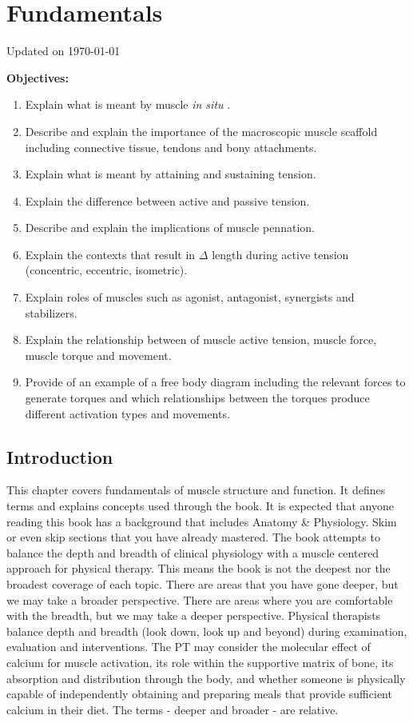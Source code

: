 \chapter{Fundamentals}\label{chp:fundamentals}
Updated on \today

\minitoc

\begin{svgraybox}
   \textbf{Objectives:}
\begin{enumerate}
   \item Explain what is meant by muscle \textit{in situ} .
    \item Describe and explain the importance of the macroscopic muscle scaffold including connective tissue, tendons and bony attachments.
    \item Explain what is meant by attaining and sustaining tension.
    \item Explain the difference between active and passive tension.
    \item Describe and explain the implications of muscle pennation.
    \item Explain the contexts that result in $\Delta$ length during active tension (concentric, eccentric, isometric).
    \item Explain roles of muscles such as agonist, antagonist, synergists and stabilizers.
    \item Explain the relationship between of muscle active tension, muscle force, muscle torque and movement.
    \item Provide of an example of a free body diagram including the relevant forces to generate torques and which relationships between the torques produce different activation types and movements.
\end{enumerate}
\end{svgraybox}

\section*{Introduction}
This chapter covers fundamentals of muscle structure and function. It defines terms and explains concepts used through the book. It is expected that anyone reading this book has a background that includes Anatomy \& Physiology. Skim or even skip sections that you have already mastered. The book attempts to balance the depth and breadth of clinical physiology with a muscle centered approach for physical therapy. This means the book is not the deepest nor the broadest coverage of each topic. There are areas that you have gone deeper, but we may take a broader perspective. There are areas where you are comfortable with the breadth, but we may take a deeper perspective. Physical therapists balance depth and breadth (look down, look up and beyond) during examination, evaluation and interventions. The PT may consider the molecular effect of calcium for muscle activation, its role within the supportive matrix of bone, its absorption and distribution through the body, and whether someone is physically capable of independently obtaining and preparing meals that provide sufficient calcium in their diet. The terms - deeper and broader - are relative.

